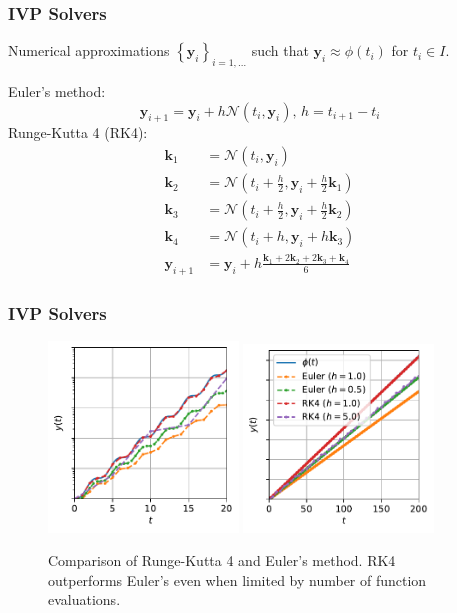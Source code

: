 \documentclass[t]{beamer}
\begin{document}
\begin{frame}
    \frametitle{IVP Solvers}
    Numerical approximations $\left\{ \bm{y}_i \right\}_{i=1,\ldots}$ such that $\bm{y}_i \approx \phi(t_i)$ for $t_i \in I$. \pause

    Euler's method: \[
\bm{y}_{i+1} = \bm{y}_{i} + h\mathcal{N}\left( t_i, \bm{y}_i \right),\,h=t_{i+1}-t_i
    \] \pause
    Runge-Kutta 4 (RK4):
    \begin{align*}
	\bm{k}_1 &= \mathcal{N}\left( t_i , \bm{y}_i \right)  \\
	\bm{k}_2 &= \mathcal{N}\left( t_i+\frac{h}{2}, \bm{y}_i + \frac{h}{2}\bm{k}_1 \right)  \\
	\bm{k}_3 &= \mathcal{N}\left( t_i+\frac{h}{2}, \bm{y}_i + \frac{h}{2}\bm{k}_2 \right)  \\
	\bm{k}_4 &= \mathcal{N}\left( t_i+h, \bm{y}_i + h \bm{k}_3 \right) \\
	\bm{y}_{i+1} &= \bm{y}_i + h \frac{\bm{k}_1 + 2\bm{k}_2 + 2 \bm{k}_3 + \bm{k}_4}{6}
    \end{align*}
\end{frame}

\begin{frame}
    \frametitle{IVP Solvers}
    \begin{figure}[h]
	\centering
	\includegraphics[width=0.45\textwidth]{../images/ode_solver_comparison_zoom.pdf}
	\includegraphics[width=0.45\textwidth]{../images/ode_solver_comparison.pdf}
	\caption{Comparison of Runge-Kutta 4 and Euler's method. RK4 outperforms Euler's even when limited by number of function evaluations.}
	\label{fig:ode_comparison}
    \end{figure}
\end{frame}
\end{document}
